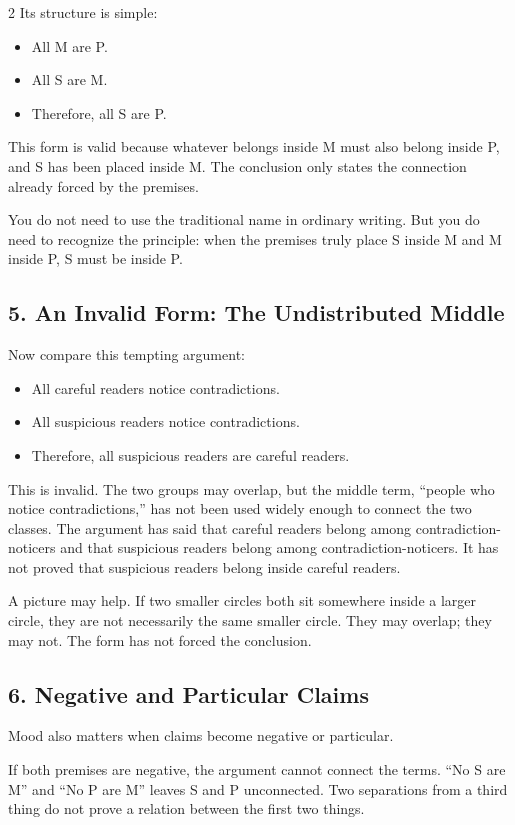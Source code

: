 \documentclass[12pt]{article}
\begin{document}
\begin{multicols}{2}
Its structure is simple:
\begin{itemize}[leftmargin=*]
\item All M are P.
\item All S are M.
\item Therefore, all S are P.
\end{itemize}

This form is valid because whatever belongs inside M must also belong inside P, and S has been placed inside M. The conclusion only states the connection already forced by the premises.

You do not need to use the traditional name in ordinary writing. But you do need to recognize the principle: when the premises truly place S inside M and M inside P, S must be inside P.

\subsection*{5. An Invalid Form: The Undistributed Middle}
Now compare this tempting argument:
\begin{itemize}[leftmargin=*]
\item All careful readers notice contradictions.
\item All suspicious readers notice contradictions.
\item Therefore, all suspicious readers are careful readers.
\end{itemize}

This is invalid. The two groups may overlap, but the middle term, ``people who notice contradictions,'' has not been used widely enough to connect the two classes. The argument has said that careful readers belong among contradiction-noticers and that suspicious readers belong among contradiction-noticers. It has not proved that suspicious readers belong inside careful readers.

A picture may help. If two smaller circles both sit somewhere inside a larger circle, they are not necessarily the same smaller circle. They may overlap; they may not. The form has not forced the conclusion.

\subsection*{6. Negative and Particular Claims}
Mood also matters when claims become negative or particular.

If both premises are negative, the argument cannot connect the terms. ``No S are M'' and ``No P are M'' leaves S and P unconnected. Two separations from a third thing do not prove a relation between the first two things.


\end{multicols}
\end{document}
